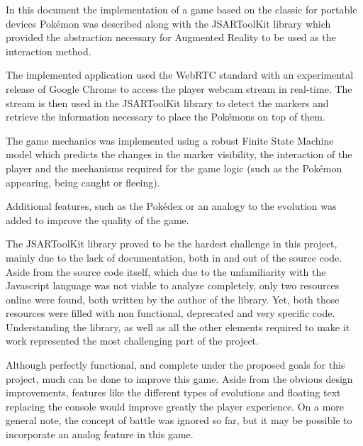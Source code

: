 \label{sec:conclusion}

In this document the implementation of a game based on the classic for portable devices Pokémon\textsuperscript{\textregistered} was described along with the JSARToolKit library which provided the abstraction necessary for Augmented Reality to be used as the interaction method.

The implemented application used the WebRTC standard with an experimental release of Google Chrome to access the player webcam stream in real-time. The stream is then used in the JSARToolKit library to detect the markers and retrieve the information necessary to place the Pokémons on top of them.

The game mechanics was implemented using a robust Finite State Machine model which predicts the changes in the marker visibility, the interaction of the player and the mechanisms required for the game logic (such as the Pokémon appearing, being caught or fleeing).

Additional features, such as the Pokédex or an analogy to the evolution was added to improve the quality of the game.

The JSARToolKit library proved to be the hardest challenge in this project, mainly due to the lack of documentation, both in and out of the source code. Aside from the source code itself, which due to the unfamiliarity with the Javascript language was not viable to analyze completely, only two resources online were found, both written by the author of the library. Yet, both those resources were filled with non functional, deprecated and very specific code. Understanding the library, as well as all the other elements required to make it work represented the most challenging part of the project.

Although perfectly functional, and complete under the proposed goals for this project, much can be done to improve this game. Aside from the obvious design improvements, features like the different types of evolutions and floating text replacing the console would improve greatly the player experience. On a more general note, the concept of battle was ignored so far, but it may be possible to incorporate an analog feature in this game.